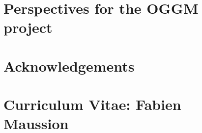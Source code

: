 \documentclass[twoside,10pt,openright]{scrbook} %
\begin{document}


\chapter{Perspectives for the OGGM project}
\label{perspectives}



\chapter{Acknowledgements}



\chapter{Curriculum Vitae: Fabien Maussion}




%
%
%
%
%
%
%
%

%
%
%
%
%

\begin{footnotesize}
\cleardoublepage{}


\end{footnotesize}
\end{document}
